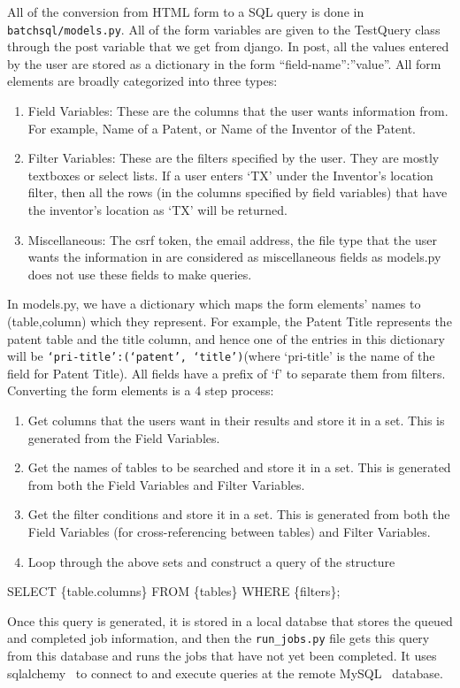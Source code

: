 All of the conversion from HTML form to a SQL query is done in \verb`batchsql/models.py`. All of the form variables are given to the TestQuery class through the post variable that we get from django. In post, all the values entered by the user are stored as a dictionary in the form {“field-name”:”value”}. All form elements are broadly categorized into three types: 

\begin{enumerate}
\item Field Variables: These are the columns that the user wants information from. For example, Name of a Patent, or Name of the Inventor of the Patent.
\item Filter Variables: These are the filters specified by the user. They are mostly textboxes or select lists. If a user enters ‘TX’ under the Inventor’s location filter, then all the rows (in the columns specified by field variables) that have the inventor’s location as ‘TX’ will be returned.
\item Miscellaneous: The csrf token, the email address, the file type that the user wants the information in are considered as miscellaneous fields as models.py does not use these fields to make queries.
\end{enumerate}

	In models.py, we have a dictionary which maps the form elements’ names to (table,column) which they represent. For example, the Patent Title represents the patent table and the title column, and hence one of the entries in this dictionary will be \verb`‘pri-title’:(‘patent’, ‘title’)`(where ‘pri-title’ is the name of the field for Patent Title). All fields have a prefix of ‘f’ to separate them from filters. Converting the form elements is a 4 step process:

\begin{enumerate}
\item Get columns that the users want in their results and store it in a set. This is generated from the Field Variables.
\item Get the names of tables to be searched and store it in a set. This is generated from both the Field Variables and Filter Variables.
\item Get the filter conditions and store it in a set. This is generated from both the Field Variables (for cross-referencing between tables) and Filter Variables.
\item Loop through the above sets and construct a query of the structure\\
\end{enumerate}

\begin{center}
SELECT \{table.columns\} FROM \{tables\} WHERE \{filters\};
\end{center}

	Once this query is generated, it is stored in a local databse that stores the queued and completed job information, and then the \verb`run_jobs.py` file gets this query from this database and runs the jobs that have not yet been completed. It uses sqlalchemy~\cite{sqlalchemy} to connect  to and execute queries at the remote MySQL~\cite{mysql} database.